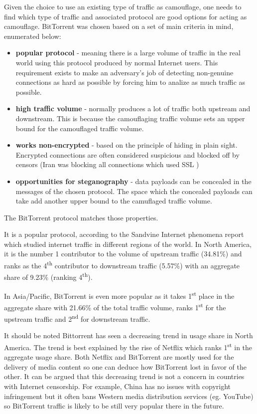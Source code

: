 \documentclass[11pt]{article} %
\begin{document}
Given the choice to use an existing type of traffic as camouflage, one needs to find which type of traffic and associated protocol are good options for acting as camouflage. BitTorrent was chosen based on a set of main criteria in mind, enumerated below:

\begin{itemize}
\item \textbf{popular protocol} - meaning there is a large volume of traffic in the real world using this protocol produced by normal Internet users. This requirement exists to make an adversary's job of detecting non-genuine connections as hard as possible by forcing him to analize as much traffic as possible.
\item \textbf{high traffic volume} - normally produces a lot of traffic both upstream and downstream. This is because the camouflaging traffic volume sets an upper bound for the camouflaged traffic volume.
\item \textbf{works non-encrypted} - based on the principle of hiding in plain sight. Encrypted connections are often considered suspicious and blocked off by censors (Iran was blocking all connections which used SSL \citep*{web:iranBlocksEncryptedTraffic})
\item \textbf{opportunities for steganography} - data payloads can be concealed in the messages of the chosen protocol. The space which the concealed payloads can take add another upper bound to the camuflaged traffic volume.

\end{itemize}

The BitTorrent protocol matches those properties.

It is a popular protocol, according to the Sandvine Internet phenomena report \citep*{web:sandvineInternet} which studied internet traffic in different regions of the world. In North America, it is the number 1 contributor to the volume of upstream traffic (34.81\%) and ranks as the 4\textsuperscript{th} contributor to downstream traffic (5.57\%) with an aggregate share of 9.23\% (ranking 4\textsuperscript{th}).

In Asia/Pacific, BitTorrent is even more popular as it takes 1\textsuperscript{st} place in the aggregate share with 21.66\% of the total traffic volume, ranks  1\textsuperscript{st} for the upstream traffic and  2\textsuperscript{nd} for downstream traffic.

It should be noted Bittorrent has seen a decreasing trend in usage share in North America. The trend is best explained by the rise of Netflix which ranks 1\textsuperscript{st} in the aggregate usage share. Both Netflix and BitTorrent are mostly used for the delivery of media content so one can deduce how BitTorrent lost in favor of the other. It can be argued that this decreasing trend is not a concern in countries with Internet censorship. For example, China has no issues with copyright infringement but it often bans Western media distribution services (eg. YouTube) so BitTorrent traffic is likely to be still very popular there in the future.
\end{document}
